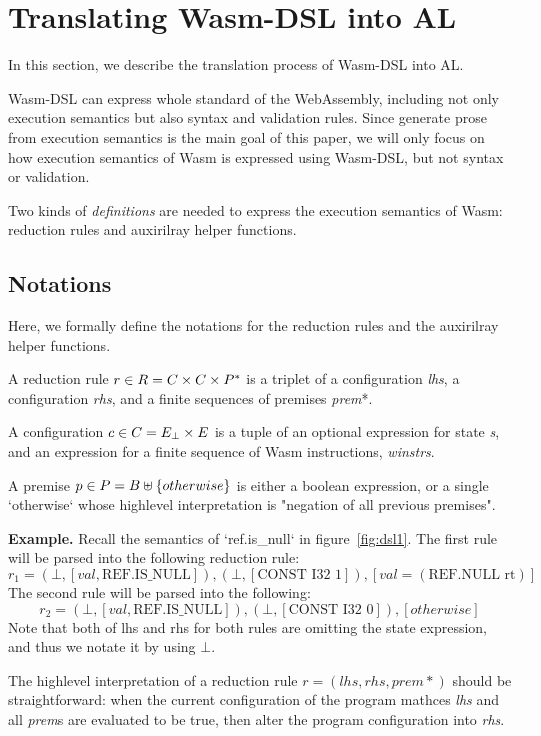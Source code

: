 \section{Translating Wasm-DSL into AL}\label{sec:translate}

In this section, we describe the translation process of Wasm-DSL into AL.

Wasm-DSL can express whole standard of the WebAssembly, including not only
execution semantics but also syntax and validation rules.
Since generate prose from execution semantics is the main goal of this paper,
we will only focus on how execution semantics of Wasm is expressed using Wasm-DSL, but not syntax or validation.

Two kinds of \textit{definitions} are needed to express the execution semantics of Wasm:
reduction rules and auxirilray helper functions.

\subsection{Notations}
Here, we formally define the notations for the reduction rules and the auxirilray helper functions.

A reduction rule $r \in R = C \times C \times P^\ast$ is a triplet of a
configuration \textit{lhs}, a configuration \textit{rhs}, and a finite sequences of premises \textit{prem}*.

A configuration $c \in C = E_\bot \times E$ is a tuple of an optional expression for state \textit{s},
and an expression for a finite sequence of Wasm instructions, \textit{winstrs}.

A premise $p \in P = B \uplus \{otherwise\}$ is either a boolean expression, or a
single `otherwise` whose highlevel interpretation is "negation of all previous premises".

\textbf{Example.} Recall the semantics of `ref.is\_null` in figure~\ref{fig:dsl1}.
The first rule will be parsed into the following reduction rule:
\[r_1=(\bot, [val, \text{REF.IS\_NULL}]), (\bot, [\text{CONST I32 1}]), [val = (\text{REF.NULL rt})]\]
The second rule will be parsed into the following:
\[r_2=(\bot, [val, \text{REF.IS\_NULL}]), (\bot, [\text{CONST I32 0}]), [otherwise]\]
Note that both of lhs and rhs for both rules are omitting the state expression,
and thus we notate it by using $\bot$.

The highlevel interpretation of a reduction rule $r = (lhs, rhs, prem*)$ should be straightforward:
when the current configuration of the program mathces \textit{lhs} and all \textit{prem}s are
evaluated to be true, then alter the program configuration into \textit{rhs}.

